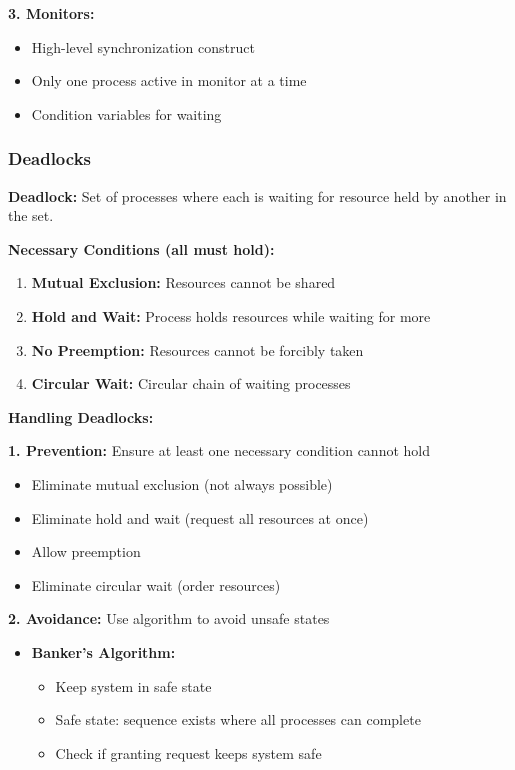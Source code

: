\documentclass[11pt,a4paper]{article}
\begin{document}
\textbf{3. Monitors:}
\begin{itemize}
    \item High-level synchronization construct
    \item Only one process active in monitor at a time
    \item Condition variables for waiting
\end{itemize}

\subsubsection{Deadlocks}

\begin{defbox}
\textbf{Deadlock:} Set of processes where each is waiting for resource held by another in the set.
\end{defbox}

\textbf{Necessary Conditions (all must hold):}
\begin{enumerate}
    \item \textbf{Mutual Exclusion:} Resources cannot be shared
    \item \textbf{Hold and Wait:} Process holds resources while waiting for more
    \item \textbf{No Preemption:} Resources cannot be forcibly taken
    \item \textbf{Circular Wait:} Circular chain of waiting processes
\end{enumerate}

\textbf{Handling Deadlocks:}

\textbf{1. Prevention:} Ensure at least one necessary condition cannot hold
\begin{itemize}
    \item Eliminate mutual exclusion (not always possible)
    \item Eliminate hold and wait (request all resources at once)
    \item Allow preemption
    \item Eliminate circular wait (order resources)
\end{itemize}

\textbf{2. Avoidance:} Use algorithm to avoid unsafe states
\begin{itemize}
    \item \textbf{Banker's Algorithm:}
    \begin{itemize}
        \item Keep system in safe state
        \item Safe state: sequence exists where all processes can complete
        \item Check if granting request keeps system safe
    \end{itemize}
\end{itemize}
\end{document}
